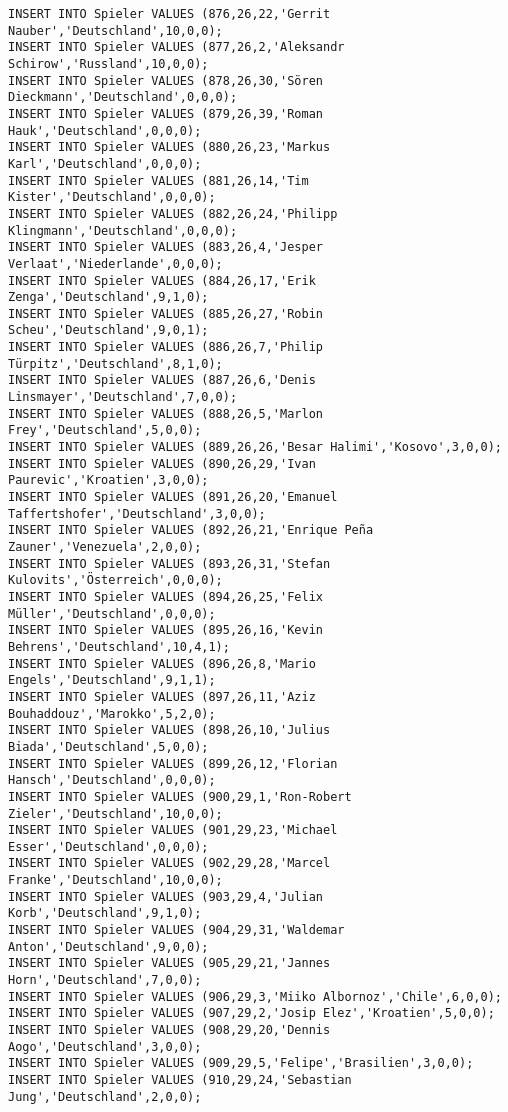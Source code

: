 \documentclass{lehramt-informatik-aufgabe}
\begin{document}
\begin{verbatim}
INSERT INTO Spieler VALUES (876,26,22,'Gerrit Nauber','Deutschland',10,0,0);
INSERT INTO Spieler VALUES (877,26,2,'Aleksandr Schirow','Russland',10,0,0);
INSERT INTO Spieler VALUES (878,26,30,'Sören Dieckmann','Deutschland',0,0,0);
INSERT INTO Spieler VALUES (879,26,39,'Roman Hauk','Deutschland',0,0,0);
INSERT INTO Spieler VALUES (880,26,23,'Markus Karl','Deutschland',0,0,0);
INSERT INTO Spieler VALUES (881,26,14,'Tim Kister','Deutschland',0,0,0);
INSERT INTO Spieler VALUES (882,26,24,'Philipp Klingmann','Deutschland',0,0,0);
INSERT INTO Spieler VALUES (883,26,4,'Jesper Verlaat','Niederlande',0,0,0);
INSERT INTO Spieler VALUES (884,26,17,'Erik Zenga','Deutschland',9,1,0);
INSERT INTO Spieler VALUES (885,26,27,'Robin Scheu','Deutschland',9,0,1);
INSERT INTO Spieler VALUES (886,26,7,'Philip Türpitz','Deutschland',8,1,0);
INSERT INTO Spieler VALUES (887,26,6,'Denis Linsmayer','Deutschland',7,0,0);
INSERT INTO Spieler VALUES (888,26,5,'Marlon Frey','Deutschland',5,0,0);
INSERT INTO Spieler VALUES (889,26,26,'Besar Halimi','Kosovo',3,0,0);
INSERT INTO Spieler VALUES (890,26,29,'Ivan Paurevic','Kroatien',3,0,0);
INSERT INTO Spieler VALUES (891,26,20,'Emanuel Taffertshofer','Deutschland',3,0,0);
INSERT INTO Spieler VALUES (892,26,21,'Enrique Peña Zauner','Venezuela',2,0,0);
INSERT INTO Spieler VALUES (893,26,31,'Stefan Kulovits','Österreich',0,0,0);
INSERT INTO Spieler VALUES (894,26,25,'Felix Müller','Deutschland',0,0,0);
INSERT INTO Spieler VALUES (895,26,16,'Kevin Behrens','Deutschland',10,4,1);
INSERT INTO Spieler VALUES (896,26,8,'Mario Engels','Deutschland',9,1,1);
INSERT INTO Spieler VALUES (897,26,11,'Aziz Bouhaddouz','Marokko',5,2,0);
INSERT INTO Spieler VALUES (898,26,10,'Julius Biada','Deutschland',5,0,0);
INSERT INTO Spieler VALUES (899,26,12,'Florian Hansch','Deutschland',0,0,0);
INSERT INTO Spieler VALUES (900,29,1,'Ron-Robert Zieler','Deutschland',10,0,0);
INSERT INTO Spieler VALUES (901,29,23,'Michael Esser','Deutschland',0,0,0);
INSERT INTO Spieler VALUES (902,29,28,'Marcel Franke','Deutschland',10,0,0);
INSERT INTO Spieler VALUES (903,29,4,'Julian Korb','Deutschland',9,1,0);
INSERT INTO Spieler VALUES (904,29,31,'Waldemar Anton','Deutschland',9,0,0);
INSERT INTO Spieler VALUES (905,29,21,'Jannes Horn','Deutschland',7,0,0);
INSERT INTO Spieler VALUES (906,29,3,'Miiko Albornoz','Chile',6,0,0);
INSERT INTO Spieler VALUES (907,29,2,'Josip Elez','Kroatien',5,0,0);
INSERT INTO Spieler VALUES (908,29,20,'Dennis Aogo','Deutschland',3,0,0);
INSERT INTO Spieler VALUES (909,29,5,'Felipe','Brasilien',3,0,0);
INSERT INTO Spieler VALUES (910,29,24,'Sebastian Jung','Deutschland',2,0,0);

\end{verbatim}
\end{document}
